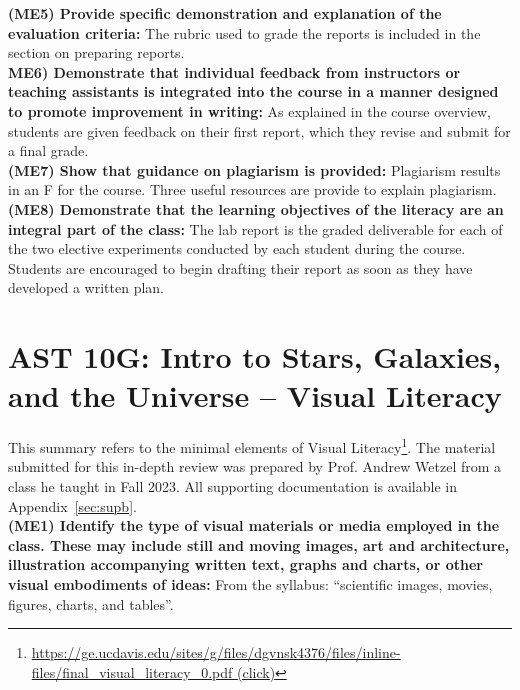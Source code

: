 \documentclass[12pt]{article}
\begin{document}
\noindent
{\bf (ME5) Provide specific demonstration and explanation of the evaluation criteria:}
The rubric used to grade the reports is included in the section on preparing reports.\\[1pt]

\noindent
{\bf ME6) Demonstrate that individual feedback from instructors or teaching assistants is integrated into the course in a manner designed to promote improvement in writing:}
As explained in the course overview, students are given feedback on their first report, which they revise and submit for a final grade.\\[1pt]

\noindent
{\bf (ME7) Show that guidance on plagiarism is provided:}
Plagiarism results in an F for the course.  Three useful resources are provide to explain plagiarism.\\[1pt]

\noindent
{\bf (ME8) Demonstrate that the learning objectives of the literacy are an integral part of the class:}
The lab report is the graded deliverable for each of the two elective experiments conducted by each student during the course.  Students are encouraged to begin drafting their report as soon as they have developed a written plan.\\[1pt]

\section{AST 10G: Intro to  Stars, Galaxies, and the Universe -- Visual Literacy}

This summary refers to the minimal elements of Visual Literacy\footnote{
\href{https://ge.ucdavis.edu/sites/g/files/dgvnsk4376/files/inline-files/final_visual_literacy_0.pdf}{
https://ge.ucdavis.edu/sites/g/files/dgvnsk4376/files/inline-files/final\_visual\_literacy\_0.pdf (click)}}.
The material submitted for this in-depth review was prepared by Prof. Andrew
Wetzel from a class he taught in Fall 2023.  All supporting documentation is available in Appendix~\ref{sec:supb}.\\

\noindent
{\bf (ME1) Identify the type of visual materials or media employed in the class. These
may include still and moving images, art and architecture, illustration
accompanying written text, graphs and charts, or other visual embodiments of
ideas:} From the syllabus:  ``scientific images, movies, figures, charts, and tables''.\\[1pt]
\end{document}
